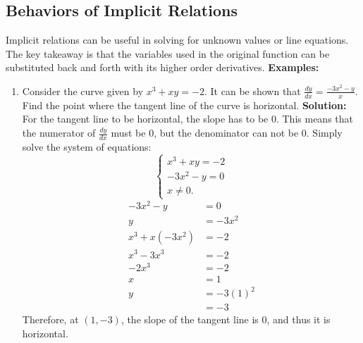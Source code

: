 \documentclass[12pt]{article}
\begin{document}
        \subsection{Behaviors of Implicit Relations} %
            Implicit relations can be useful in solving for unknown values or line equations. The key takeaway is that the variables used in the original function can be substituted back and forth with its higher order derivatives.
            \newline \newline
            \textbf{Examples:}
            \begin{enumerate}
                \item Consider the curve given by $x^3 + xy = -2$. It can be shown that $\frac{dy}{dx} = \frac{-3x^2 - y}{x}$.
                    \\ Find the point where the tangent line of the curve is horizontal.
                    \newline \newline
                    \textbf{Solution:}
                    \\ For the tangent line to be horizontal, the slope has to be $0$. This means that the numerator of $\frac{dy}{dx}$ must be $0$, but the denominator can not be $0$. Simply solve the system of equations:
                    \[ \begin{cases}
                        x^3 + xy = -2 \\
                        -3x^2 - y = 0 \\
                        x \ne 0.
                    \end{cases} \]
                    \begin{align*}
                        -3x^2 - y &= 0 \\
                        y &= -3x^2 \\[6pt]
                        x^3 + x(-3x^2) &= -2 \\
                        x^3 - 3x^3 &= -2 \\
                        -2x^3 &= -2 \\
                        x &= 1 \\[6pt]
                        y &= -3(1)^2 \\
                        &= -3
                    \end{align*}
                    Therefore, at $(1, -3)$, the slope of the tangent line is $0$, and thus it is horizontal.
            \end{enumerate}
\end{document}
